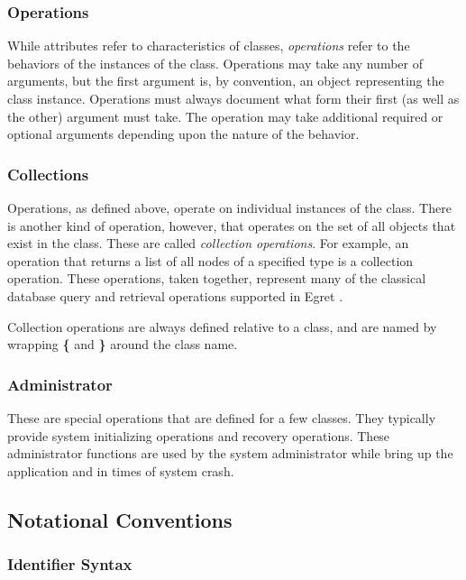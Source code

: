 \subsubsection{Operations}

While attributes refer to characteristics of classes, {\em operations}
refer to the behaviors of the instances of the class. Operations may
take any number of arguments, but the first argument is, by
convention, an object representing the class instance.  Operations
must always document what form their first (as well as the other)
argument must take. The operation may take additional required or
optional arguments depending upon the nature of the behavior.

\subsubsection{Collections}

Operations, as defined above, operate on individual instances of the
class. There is another kind of operation, however, that operates on
the set of all objects that exist in the class. These are called {\em
collection operations}.  For example, an operation that returns a list
of all nodes of a specified type is a collection operation.  These
operations, taken together, represent many of the classical database
query and retrieval operations supported in Egret .

Collection operations are always defined relative to a class, and are
named by wrapping {\bf \{} and {\bf \}} around the class name. 

\subsubsection{Administrator}

These are special operations that are defined for a few classes.  They
typically provide system initializing operations and recovery
operations.  These administrator functions are used by the system
administrator while bring up the application and in times of system
crash.


\subsection{Notational Conventions}
\label{conventions}

\subsubsection{Identifier Syntax}

